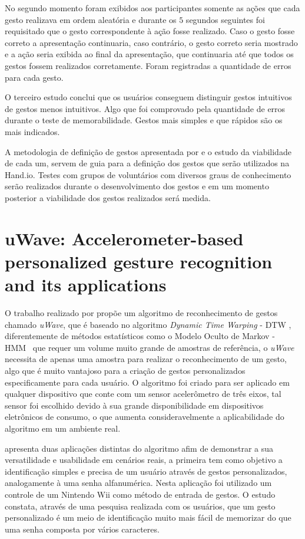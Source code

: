 No segundo momento foram exibidos aos participantes somente as ações que cada gesto realizava em ordem aleatória e durante os $5$ segundos seguintes foi requisitado que o gesto correspondente à ação fosse realizado. Caso o gesto fosse correto a apresentação continuaria, caso contrário, o gesto correto seria mostrado e a ação seria exibida ao final da apresentação, que continuaria até que todos os gestos fossem realizados corretamente. Foram registradas a quantidade de erros para cada gesto.

O terceiro estudo conclui que os usuários conseguem distinguir gestos intuitivos de gestos menos intuitivos. Algo que foi comprovado pela quantidade de erros durante o teste de memorabilidade. Gestos mais simples e que rápidos são os mais indicados.

A metodologia de definição de gestos apresentada por  e o estudo da viabilidade de cada um, servem de guia para a definição dos gestos que serão utilizados na Hand.io. Testes com grupos de voluntários com diversos graus de conhecimento serão realizados durante o desenvolvimento dos gestos e em um momento posterior a viabilidade dos gestos realizados será medida.



\section{uWave: Accelerometer-based personalized gesture recognition and its applications}
\label{cor:uwave}

O trabalho realizado por  propõe um algoritmo de reconhecimento de gestos chamado \textit{uWave}, que é baseado no algoritmo \textit{Dynamic Time Warping} - DTW \cite{Salvador:2007}, diferentemente de métodos estatísticos como o Modelo Oculto de Markov - HMM~\cite{hmm:1989} que requer um volume muito grande de amostras de referência, o \textit{uWave} necessita de apenas uma amostra para realizar o reconhecimento de um gesto, algo que é muito vantajoso para a criação de gestos personalizados especificamente para cada usuário. O algoritmo foi criado para ser aplicado em qualquer dispositivo que conte com um sensor acelerômetro de três eixos, tal sensor foi escolhido devido à sua grande disponibilidade em dispositivos eletrônicos de consumo, o que aumenta consideravelmente a aplicabilidade do algoritmo em um ambiente real.

 apresenta duas aplicações distintas do algoritmo afim de demonstrar a sua versatilidade e usabilidade em cenários reais, a primeira tem como objetivo a identificação simples e precisa de um usuário através de gestos personalizados, analogamente à uma senha alfanumérica. Nesta aplicação foi utilizado um controle de um Nintendo Wii \cite{wii} como método de entrada de gestos. O estudo constata, através de uma pesquisa realizada com os usuários, que um gesto personalizado é um meio de identificação muito mais fácil de memorizar do que uma senha composta por vários caracteres. 

